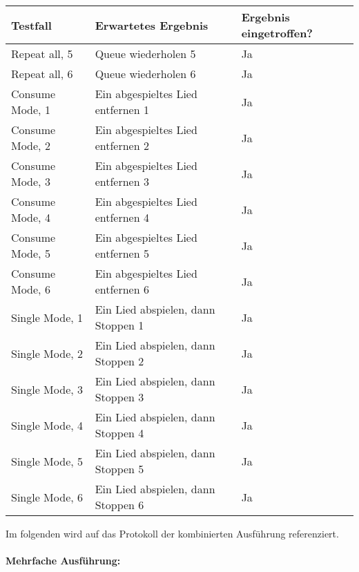 \begin{tabularx}{\textwidth}{|X|l|p{3cm}|}
    \hline
    \textbf{Testfall} & \textbf{Erwartetes Ergebnis} & \textbf{Ergebnis eingetroffen?}\\
    \hline
    Repeat all, 5 & Queue wiederholen 5 & Ja\\
    \hline
    Repeat all, 6 & Queue wiederholen 6 & Ja\\
    \hline
    Consume Mode, 1 & Ein abgespieltes Lied entfernen 1 & Ja\\
    \hline
    Consume Mode, 2 & Ein abgespieltes Lied entfernen 2 & Ja\\
    \hline
    Consume Mode, 3 & Ein abgespieltes Lied entfernen 3 & Ja\\
    \hline
    Consume Mode, 4 & Ein abgespieltes Lied entfernen 4 & Ja\\
    \hline
    Consume Mode, 5 & Ein abgespieltes Lied entfernen 5 & Ja\\
    \hline
    Consume Mode, 6 & Ein abgespieltes Lied entfernen 6 & Ja\\    
    \hline   
    Single Mode, 1 & Ein Lied abspielen, dann Stoppen 1 & Ja\\
    \hline
    Single Mode, 2 & Ein Lied abspielen, dann Stoppen 2 & Ja\\
    \hline
    Single Mode, 3 & Ein Lied abspielen, dann Stoppen 3 & Ja\\
    \hline
    Single Mode, 4 & Ein Lied abspielen, dann Stoppen 4 & Ja\\
    \hline
    Single Mode, 5 & Ein Lied abspielen, dann Stoppen 5 & Ja\\
    \hline
    Single Mode, 6 & Ein Lied abspielen, dann Stoppen 6 & Ja\\
    \hline
\end{tabularx}
\newpage
Im folgenden wird auf das Protokoll der kombinierten Ausführung referenziert.
\\
\\
\textbf{Mehrfache Ausführung:}
\\
